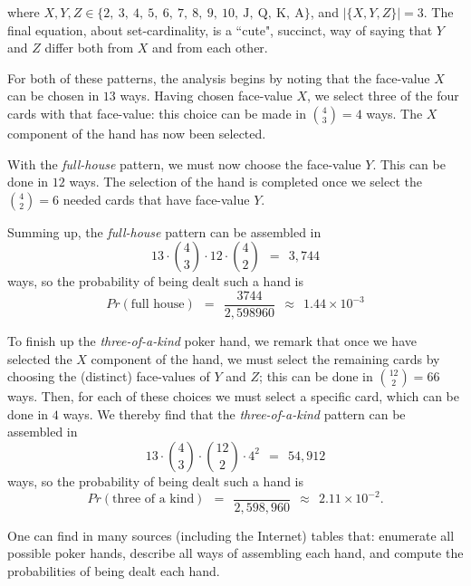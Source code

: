 \begin{itemize}
\begin{itemize}
\smallskip

where $X, Y,  Z \in \{2, \ 3, \ 4, \ 5, \ 6, \ 7, \ 8, \ 9, \ 10, \ \mbox{J}, \ \mbox{Q}, \ \mbox{K}, \ \mbox{A}\}$,  and $|\{X, Y, Z\}| =3$.  The final equation, about set-cardinality, is a ``cute", succinct, way of saying that $Y$ and $Z$ differ both from $X$ and from each other.
\end{itemize}
For both of these patterns, the analysis begins by noting that the face-value $X$ can be chosen
in $13$ ways.  Having chosen face-value $X$, we select three of the four cards with that face-value: this choice can be made in $\displaystyle {4 \choose 3} = 4$ ways.  The $X$ component of the hand has now been selected.

\smallskip

With the {\it full-house} pattern, we must now choose the face-value $Y$.  This can be done in $12$ ways.  The selection of the hand is completed once we select the $\displaystyle {4 \choose 2} = 6$ needed cards that have face-value $Y$.

\smallskip

Summing up, the {\it full-house} pattern can be assembled in
\[ 13 \cdot {4 \choose 3} \cdot 12 \cdot {4 \choose 2} \ \ = \ \  3,744 \]
ways, so the probability of being dealt such a hand is
\[ 
Pr(\mbox{full house}) \ \ = \ \
\frac{3744}{2,598960}  \ \ \approx \ \ 1.44 \times 10^{-3}
\]

\medskip

To finish up the {\it three-of-a-kind} poker hand, we remark that once we have selected the $X$
component of the hand, we must select the remaining cards by choosing the (distinct) face-values of $Y$ and $Z$; this can be done in $\displaystyle {12 \choose 2} = 66$ ways.  Then, for each of these choices we must select a specific card, which can be done in $4$ ways.  We thereby find that the {\it three-of-a-kind} pattern can be assembled in
\[ 13 \cdot {4 \choose 3} \cdot {12 \choose 2} \cdot 4^2 \ \ = \ \  54,912 \]
ways, so the probability of being dealt such a hand is
\[ Pr(\mbox{three of a kind}) \ \ = \ \
 \frac{}{2,598,960}  \ \ \approx \ \ 2.11 \times 10^{-2} . \]
\end{itemize}

\medskip

One can find in many sources (including the Internet) tables that: enumerate all possible poker hands, describe all ways of assembling each hand, and compute the probabilities of being dealt each hand.

\smallskip

